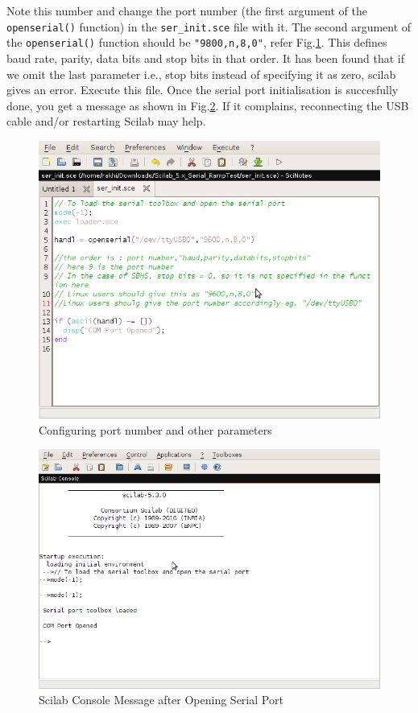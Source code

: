 \documentclass[12pt]{report}
\begin{document}
Note this number and change the port number (the first argument of the \\ {\tt openserial()} function) in the {\tt ser\_init.sce} file with it. The second argument of the {\tt openserial()} function should be {\tt "9800,n,8,0"}, refer Fig.\ref{linuxserial}. This defines baud rate, parity, data bits and stop bits in that order. It has been found that if we omit the last parameter i.e., stop bits instead of specifying it as zero, scilab gives an error. Execute this file. Once the serial port initialisation is succesfully done, you get a message as shown in Fig.\ref{console_linux}. If it complains, reconnecting the USB cable and/or restarting Scilab may help.
\begin{figure}
\centering
\includegraphics[width=\linewidth]{linuxserial.png}
\caption{Configuring port number and other parameters}
\label{linuxserial}
\end{figure}


\begin{figure}
\centering
\includegraphics[width=0.7\linewidth]{SSscilab.png}
\caption{Scilab Console Message after Opening Serial Port}
\label{console_linux}
\end{figure}
\end{document}
